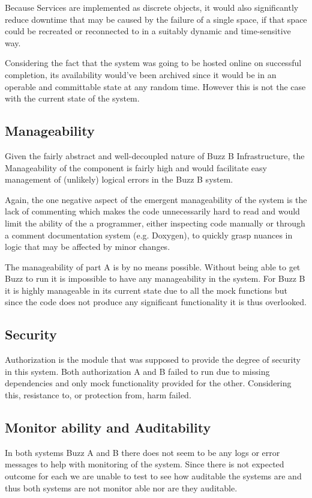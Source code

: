 \documentclass[12pt]{article}
\begin{document}
Because Services are implemented as discrete objects, it would also significantly reduce downtime that may be caused by the failure of a single space, if that space could be recreated or reconnected to in a suitably dynamic and time-sensitive way.

Considering the fact that the system was going to be hosted online on successful completion, its availability would've been archived since it would be in an operable and committable state at any random time. However this is not the case with the current state of the system.

\subsection{Manageability}
Given the fairly abstract and well-decoupled nature of Buzz B Infrastructure, the Manageability of the component is fairly high and would facilitate easy management of (unlikely) logical errors in the Buzz B system. 

Again, the one negative aspect of the emergent manageability of the system is the lack of commenting which makes the code unnecessarily hard to read and would limit the ability of the a programmer, either inspecting code manually or through a comment documentation system (e.g. Doxygen), to quickly grasp nuances in logic that may be affected by minor changes.

The manageability of part A is by no means possible. Without being able to get Buzz to run it is impossible to have any manageability in the system. For Buzz B it is highly manageable in its current state due to all the mock functions but since the code does not produce any significant functionality it is thus overlooked.
\subsection{Security}
Authorization is the module that was supposed to provide the degree of security in this system. Both authorization A and B  failed to run due to missing dependencies and only mock functionality provided for the other. Considering this, resistance to, or protection from, harm failed.
\subsection{Monitor ability and Auditability}
In both systems Buzz A and B there does not seem to be any logs or error messages to help with monitoring of the system. Since there is not expected outcome for each we are unable to test to see how auditable the systems are and thus both systems are not monitor able nor are they auditable.
\end{document}
